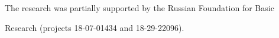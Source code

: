       


      

      

      

     







\Ack

      \noindent

      The research was partially supported by the Russian Foundation for Basic 

Research (projects 18-07-01434 and 18-29-22096).

 






\renewcommand{\bibname}{\protect\rmfamily References}




